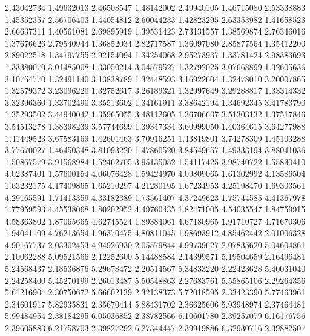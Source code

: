 2.43042734   1.49632013  
2.46508547   1.48142002  
2.49940105   1.46715080  
2.53338883   1.45352357  
2.56706403   1.44054812  
2.60044233   1.42823295  
2.63353982   1.41658523  
2.66637311   1.40561081  
2.69895919   1.39531423  
2.73131557   1.38569874  
2.76346016   1.37676626  
2.79540944   1.36852034  
2.82717587   1.36097080  
2.85877564   1.35412200  
2.89022518   1.34797755  
2.92154094   1.34254068  
2.95273937   1.33781424  
2.98383693   1.33380070  
3.01485008   1.33050214  
3.04579527   1.32792025  
3.07668899   1.32605636  
3.10754770   1.32491140  
3.13838789   1.32448593  
3.16922604   1.32478010  
3.20007865   1.32579372  
3.23096220   1.32752617  
3.26189321   1.32997649  
3.29288817   1.33314332  
3.32396360   1.33702490  
3.35513602   1.34161911  
3.38642194   1.34692345  
3.41783790   1.35293502  
3.44940042   1.35965055  
3.48112605   1.36706637  
3.51303132   1.37517846  
3.54513278   1.38398239  
3.57744699   1.39347334  
3.60999050   1.40364615  
3.64277988   1.41449523  
3.67583169   1.42601463  
3.70916251   1.43819801  
3.74278309   1.45103288  
3.77670027   1.46450348  
3.81093220   1.47860520  
3.84549657   1.49333194  
3.88041036   1.50867579  
3.91568984   1.52462705  
3.95135052   1.54117425  
3.98740722   1.55830410  
4.02387401   1.57600154  
4.06076428   1.59424970  
4.09809065   1.61302992  
4.13586504   1.63232175  
4.17409865   1.65210297  
4.21280195   1.67234953  
4.25198470   1.69303561  
4.29165591   1.71413359  
4.33182389   1.73561407  
4.37249623   1.75744585  
4.41367978   1.77959593  
4.45538068   1.80202952  
4.49760435   1.82471005  
4.54035547   1.84759915  
4.58363802   1.87065665  
4.62745524   1.89384061  
4.67180965   1.91710727  
4.71670306   1.94041109  
4.76213654   1.96370475  
4.80811045   1.98693912  
4.85462442   2.01006328  
4.90167737   2.03302453  
4.94926930   2.05579844  
4.99739627   2.07835620  
5.04604861   2.10062288  
5.09521566   2.12252600  
5.14488584   2.14399571  
5.19504659   2.16496481  
5.24568437   2.18536876  
5.29678472   2.20514567  
5.34833220   2.22423628  
5.40031040   2.24258400  
5.45270199   2.26013487  
5.50548863   2.27683761  
5.55865106   2.29264356  
5.61216904   2.30750672  
5.66602139   2.32138373  
5.72018595   2.33423390  
5.77463961   2.34601917  
5.82935831   2.35670414  
5.88431702   2.36625606  
5.93948974   2.37464481  
5.99484954   2.38184295  
6.05036852   2.38782566  
6.10601780   2.39257079  
6.16176756   2.39605883  
6.21758703   2.39827292  
6.27344447   2.39919886  
6.32930716   2.39882507 